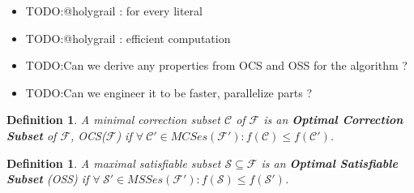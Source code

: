 \documentclass{article}
\newcommand\m[1]{\mathcal{#1}}
\newtheorem{definition}[thm]{Definition}
\newcommand\comment[1]{\marginpar{\tiny #1}}
\renewcommand\comment[1]{#1}
\newcommand{\todo}[1]{{\comment{\color{red}\textsc{TODO:}#1}}}
\begin{document}
\begin{itemize}
  \item \todo{@holygrail : for every literal }
  \item \todo{@holygrail : efficient computation}
  \item \todo{Can we derive any properties from OCS and OSS for the algorithm ?}
  \item \todo{Can we engineer it to be faster, parallelize parts ?}
\end{itemize}

\begin{definition}
  A \emph{minimal correction subset} $\m{C}$ of $\m{F}$ is an \textbf{Optimal Correction Subset} of $\m{F}$, OCS($\m{F}$) if $\forall \ \m{C}' \in MCSes(\m{F}'): f(\m{C}) \leq f(\m{C}')$.
\end{definition}

\begin{definition}
  A \emph{maximal satisfiable subset} $\m{S} \subseteq \m{F}$ is an \textbf{Optimal Satisfiable Subset} (OSS) if $\forall \ \m{S}' \in MSSes(\m{F}'): f(\m{S}) \leq f(\m{S}')$.
\end{definition}



\newpage


\end{document}
